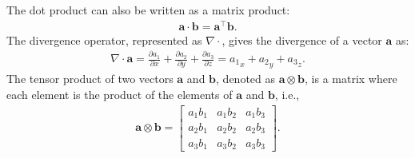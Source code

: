 The dot product can also be written as a matrix product:
\begin{align*}
    \mathbf{a} \cdot \mathbf{b} = \mathbf{a}^\top \mathbf{b}.
\end{align*}
The divergence operator, represented as $\nabla \cdot $, gives the divergence of a vector $\mathbf{a}$ as:
\begin{align*}
    \nabla \cdot \mathbf{a} = \frac{\partial a_1}{\partial x} + \frac{\partial a_2}{\partial y} + \frac{\partial a_3}{\partial z} = {a_1}_x + {a_2}_y + {a_3}_z.
\end{align*}
The tensor product of two vectors $\mathbf{a}$ and $\mathbf{b}$, denoted as $\mathbf{a} \otimes \mathbf{b}$, is a matrix where each element is the product of the elements of $\mathbf{a}$ and $\mathbf{b}$, i.e.,
\begin{align*}
    \mathbf{a} \otimes \mathbf{b} = \begin{bmatrix}
        a_1 b_1 & a_1 b_2 & a_1 b_3 \\
        a_2 b_1 & a_2 b_2 & a_2 b_3 \\
        a_3 b_1 & a_3 b_2 & a_3 b_3
\end{bmatrix}.
\end{align*}




